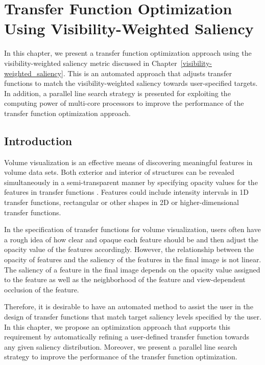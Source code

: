 \chapter{Transfer Function Optimization Using Visibility-Weighted Saliency \label{transfer_function_optimization}}
In this chapter, we present a transfer function optimization approach using the visibility-weighted saliency metric discussed in Chapter~\ref{visibility-weighted_saliency}.
This is an automated approach that adjusts transfer functions to match the visibility-weighted saliency towards user-specified targets.
In addition, a parallel line search strategy is presented for exploiting the computing power of multi-core processors to improve the performance of the transfer function optimization approach.

\section{Introduction}
Volume visualization is an effective means of discovering meaningful features in volume data sets.
Both exterior and interior of structures can be revealed simultaneously in a semi-transparent manner by specifying opacity values for the features in transfer functions \cite{wang_efficient_2011}.
Features could include intensity intervals in 1D transfer functions, rectangular or other shapes in 2D or higher-dimensional transfer functions.

In the specification of transfer functions for volume visualization, users often have a rough idea of how clear and opaque each feature should be and then adjust the opacity value of the features accordingly.
However, the relationship between the opacity of features and the saliency of the features in the final image is not linear.
The saliency of a feature in the final image depends on the opacity value assigned to the feature as well as the neighborhood of the feature and view-dependent occlusion of the feature.


Therefore, it is desirable to have an automated method to assist the user in the design of transfer functions that match target saliency levels specified by the user. In this chapter, we propose an optimization approach that supports this requirement by automatically refining a user-defined transfer function towards any given saliency distribution.
Moreover, we present a parallel line search strategy to improve the performance of the transfer function optimization.

